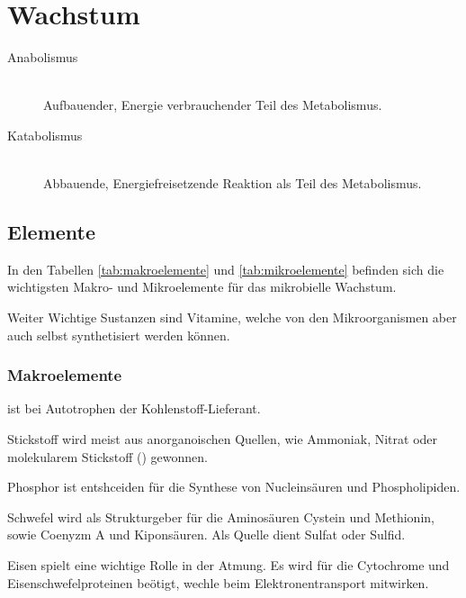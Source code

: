 \section{Wachstum}

\begin{description}
	\item[Anabolismus] \hfill \\
		Aufbauender, Energie verbrauchender Teil des Metabolismus.
	\item[Katabolismus] \hfill \\
		Abbauende, Energiefreisetzende Reaktion als Teil des Metabolismus.
\end{description}

\subsection{Elemente}

In den Tabellen \ref{tab:makroelemente} und \ref{tab:mikroelemente} befinden sich die
wichtigsten Makro- und Mikroelemente für das mikrobielle Wachstum.

Weiter Wichtige Sustanzen sind Vitamine,
welche von den Mikroorganismen aber auch selbst synthetisiert werden können.

\subsubsection*{Makroelemente}

 ist bei Autotrophen der Kohlenstoff-Lieferant.

Stickstoff wird meist aus anorganoischen Quellen,
wie Ammoniak, Nitrat oder molekularem Stickstoff () gewonnen.

Phosphor ist entshceiden für die Synthese von Nucleinsäuren und Phospholipiden.

Schwefel wird als Strukturgeber für die Aminosäuren Cystein und Methionin, 
sowie Coenyzm A und Kiponsäuren.
Als Quelle dient Sulfat oder Sulfid.

Eisen spielt eine wichtige Rolle in der Atmung.
Es wird für die Cytochrome und Eisenschwefelproteinen beötigt,
wechle beim Elektronentransport mitwirken.

